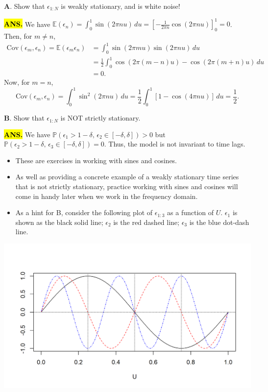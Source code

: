 \documentclass[]{article}
\newcommand{\PP}{\mathbb{P}}
\newcommand{\EE}{\mathbb{E}}
\newcommand{\cov}{\text{Cov}}
\begin{document}
\textbf{A}. Show that \(\epsilon_{1:N}\) is weakly stationary, and is
white noise!

\hl{\textbf{ANS.}} We have $\EE(\epsilon_n) = \int_{0}^{1}\sin(2\pi nu)\,du=\left[-\frac{1}{2\pi n}\cos(2\pi n u)\right]^1_0 = 0$. Then, for $m\neq n$,
\begin{align*}
\cov(\epsilon_m,\epsilon_n) = \EE(\epsilon_m\epsilon_n) &= \int_{0}^{1}\sin(2\pi mu)\sin(2\pi n u)\, du\\
&=\frac{1}{2}\int_{0}^{1}\cos(2\pi(m-n)u) - \cos(2\pi(m+n)u)\, du\\
&=0.
\end{align*}
Now, for $m=n$,
$$\cov(\epsilon_m,\epsilon_n) = \int_{0}^{1}\sin^2(2\pi nu)\, du=\frac{1}{2}\int_{0}^{1}\left[1-\cos(4\pi nu)\right]\, du = \frac{1}{2}. $$

\textbf{B}. Show that \(\epsilon_{1:N}\) is NOT strictly stationary.

\hl{\textbf{ANS.}} We have $\PP(\epsilon_1 > 1-\delta,\, \epsilon_2\in[-\delta,
\delta])>0$ but $\PP(\epsilon_2>1-\delta,\, \epsilon_3\in [-\delta,\delta])=0$. Thus, the model is not invariant to time lags.

\begin{itemize}
\item
  These are exercises in working with sines and cosines.
\item
  As well as providing a concrete example of a weakly stationary time
  series that is not strictly stationary, practice working with sines
  and cosines will come in handy later when we work in the frequency
  domain.
\item
  As a hint for B, consider the following plot of \(\epsilon_{1:3}\) as
  a function of \(U\). \(\epsilon_1\) is shown as the black solid line;
  \(\epsilon_2\) is the red dashed line; \(\epsilon_3\) is the blue
  dot-dash line.
\end{itemize}

\includegraphics{figure/intro-sinusoidal-1.png}
\end{document}

